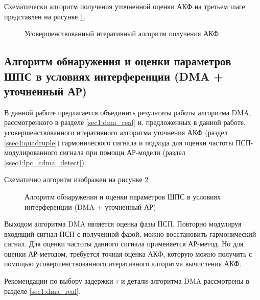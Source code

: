 Схематически алгоритм получения уточненной оценки АКФ на третьем шаге представлен на рисунке \ref{pic:akf_pic}.

\begin{figure}[H]
	\center{}
	\caption{Усовершенствованный итеративный алгоритм получения АКФ}
	\label{pic:akf_pic}
\end{figure}

\subsection{Алгоритм обнаружения и оценки параметров ШПС в условиях интерференции (DMA + уточненный АР)}
\label{sec4:dma_lpc_algo}

В данной работе предлагается объединить результаты работы алгоритма DMA, рассмотренного в разделе
\ref{sec1:dma_real} и, предложенных в данной работе, усовершенствованного итеративного 
алгоритма уточнения АКФ (раздел \ref{ssec4:quadruple}) гармонического сигнала и 
подхода для оценки частоты ПСП-модулированного сигнала при помощи АР-модели (раздел \ref{ssec4:lpc_cdma_detect}).

Схематично алгоритм изображен на рисунке \ref{pic4:dma_quadruple_lpc}

\begin{figure}[H]
\center{}
	\caption{Алгоритм обнаружения и оценки параметров ШПС в условиях интерференции (DMA + уточненный АР)}
	\label{pic4:dma_quadruple_lpc}
\end{figure}

Выходом алгоритма DMA является оценка фазы ПСП. Повторно модулируя входящий сигнал ПСП с полученной
фазой, можно восстановить гармонический сигнал. Для оценки частоты данного сигнала применяется
АР-метод. Но для оценки АР-методом, требуется точная оценка АКФ, которую можно получить
с помощью усовершенствованного итеративного алгоритма вычисления АКФ.

Рекомендации по выбору задержки ${\tau}$ и детали алгоритма DMA рассмотрены в разделе
\ref{sec1:dma_real}.


